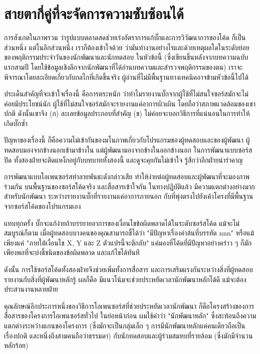 \chapter{สายตากี่คู่ที่จะจัดการความซับซ้อนได้}

การสังเกตในภาพรวม
ว่ารูปแบบตลาดสดช่วยเร่งอัตราการแก้บั๊กและการวิวัฒนาการของโค้ด
ก็เป็นส่วนหนึ่ง แต่ในอีกส่วนหนึ่ง เราก็ต้องเข้าใจด้วย
ว่ามันทำงานอย่างไรและด้วยเหตุผลใดในระดับย่อยของพฤติกรรมประจำวันของนักพัฒนาและนักทดสอบ
ในหัวข้อนี้ (ซึ่งเขียนขึ้นหลังจากบทความฉบับแรกสามปี
โดยใช้ข้อมูลเชิงลึกจากนักพัฒนาที่ได้อ่านบทความและสำรวจพฤติกรรมของตน)
เราจะพิจารณาโดยละเอียดเกี่ยวกับกลไกที่เกิดขึ้นจริง
ผู้อ่านที่ไม่มีพื้นฐานทางเทคนิคอาจข้ามหัวข้อนี้ไปได้

ประเด็นสำคัญที่จะเข้าใจเรื่องนี้ คือการตระหนัก
ว่าทำไมรายงานบั๊กจากผู้ใช้ที่ไม่สนใจซอร์สมักจะไม่ค่อยมีประโยชน์นัก
ผู้ใช้ที่ไม่สนใจซอร์สมักจะรายงานแค่อาการผิวเผิน
โดยถือว่าสภาพแวดล้อมของเขาปกติ ดังนั้นเขาจึง (ก)
ละเลยข้อมูลประกอบที่สำคัญ (ข)
ไม่ค่อยจะบอกวิธีการที่แน่นอนในการทำให้เกิดบั๊กซ้ำ

ปัญหาของเรื่องนี้
ก็คือความไม่เข้ากันของมโนภาพเกี่ยวกับโปรแกรมของผู้ทดสอบและของผู้พัฒนา
ผู้ทดสอบมองจากข้างนอกเข้ามาข้างใน แต่ผู้พัฒนามองจากข้างในออกข้างนอก
ในการพัฒนาแบบซอร์สปิด ทั้งสองฝ่ายจะติดแหง็กอยู่กับบทบาททั้งสองนี้
และดูจะคุยกันไม่เข้าใจ รู้สึกว่าอีกฝ่ายน่ารำคาญ

การพัฒนาแบบโอเพนซอร์สทำลายพันธะดังกล่าวเสีย
ทำให้ง่ายต่อผู้ทดสอบและผู้พัฒนาที่จะมองภาพร่วมกัน
บนพื้นฐานของซอร์สโค้ดจริง และสื่อสารเข้าใจกัน ในทางปฏิบัติแล้ว
มีความแตกต่างอย่างมากสำหรับนักพัฒนา
ระหว่างรายงานบั๊กที่รายงานแค่อาการภายนอก
กับที่พุ่งตรงไปยังเค้าโครงที่มีพื้นฐานจากซอร์สโค้ดของโปรแกรมเอง

แทบทุกครั้ง
บั๊กจะแก้ง่ายถ้าบรรยายอาการของเงื่อนไขข้อผิดพลาดได้ในระดับซอร์สโค้ด
แม้จะไม่สมบูรณ์ก็ตาม เมื่อผู้ทดสอบบางคนของคุณสามารถชี้ได้ว่า
"มีปัญหาเรื่องค่าล้นที่บรรทัด nnn" หรือแม้เพียงแค่ "ภายใต้เงื่อนไข X, Y
และ Z ตัวแปรนี้จะตีกลับ" แค่มองที่โค้ดที่มีปัญหาอย่างคร่าว ๆ
ก็มักเพียงพอที่จะบ่งชี้ชนิดของข้อผิดพลาด และแก้ไขได้ทันที

ดังนั้น การใช้ซอร์สโค้ดทั้งสองฝ่ายจึงช่วยเพิ่มทั้งการสื่อสาร
และการเสริมแรงกันระหว่างสิ่งที่ผู้ทดสอบรายงานกับสิ่งที่ผู้พัฒนาหลักรู้
ผลก็คือ มีแนวโน้มจะช่วยประหยัดเวลานักพัฒนาหลักได้ดี
แม้จะต้องประสานงานหลายฝ่าย

คุณลักษณ์อีกประการหนึ่งของวิธีการโอเพนซอร์สที่ช่วยประหยัดเวลานักพัฒนา
ก็คือโครงสร้างของการสื่อสารของโครงการโอเพนซอร์สทั่วไป ในย่อหน้าก่อน
ผมใช้คำว่า "นักพัฒนาหลัก" ซึ่งสะท้อนถึงความแตกต่างระหว่างแกนของโครงการ
(ซึ่งมักจะเป็นกลุ่มเล็ก ๆ  การมีนักพัฒนาหลักแค่คนเดียวถือเป็นเรื่องปกติ
และหนึ่งถึงสามคนถือว่าธรรมดา) กับนักทดสอบและผู้ร่วมสมทบที่รายล้อม
(ซึ่งมักมีจำนวนหลักร้อย)

